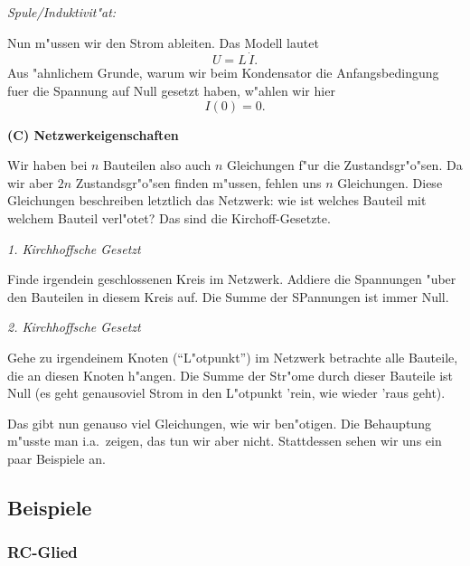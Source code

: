 {\it Spule/Induktivit"at:}\par
Nun m"ussen wir den Strom ableiten. Das Modell lautet
$$ U = L\,\dot I.$$
Aus "ahnlichem Grunde, warum wir beim Kondensator die Anfangsbedingung fuer die 
Spannung auf Null
gesetzt haben, w"ahlen wir hier
$$ I(0) = 0.$$
\par\medskip
\newpage
{\bf (C) Netzwerkeigenschaften}
\par\medskip
Wir haben bei $n$ Bauteilen also auch $n$ Gleichungen f"ur die Zustandsgr"o"sen. Da 
wir aber $2n$
Zustandsgr"o"sen finden m"ussen, fehlen uns $n$ Gleichungen. Diese Gleichungen beschreiben letztlich
das Netzwerk: wie ist welches Bauteil mit welchem Bauteil verl"otet? Das sind die Kirchoff-Gesetzte.

{\it 1. Kirchhoffsche Gesetzt}\par
Finde irgendein geschlossenen Kreis im Netzwerk. Addiere die Spannungen "uber den Bauteilen 
in diesem Kreis auf. Die Summe der SPannungen ist immer Null.

{\it 2. Kirchhoffsche Gesetzt}\par
Gehe zu irgendeinem Knoten (``L"otpunkt'') im Netzwerk betrachte alle Bauteile, die an diesen
Knoten h"angen. Die Summe der Str"ome durch dieser Bauteile ist Null (es geht genausoviel
Strom in den L"otpunkt 'rein, wie wieder 'raus geht).\par\bigskip

Das gibt nun genauso viel Gleichungen, wie wir ben"otigen. Die Behauptung m"usste man i.a.\ zeigen, 
das tun wir aber nicht. Stattdessen sehen wir uns ein paar Beispiele an.
\subsection{Beispiele}

\subsubsection{RC-Glied}

